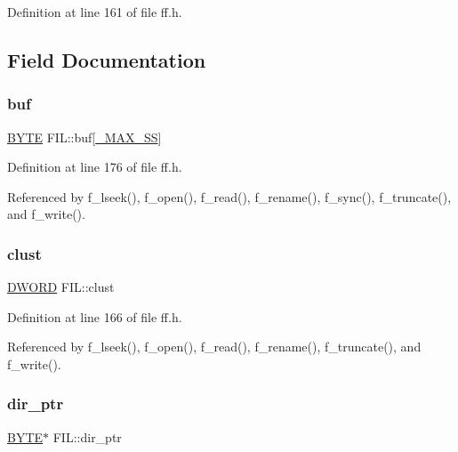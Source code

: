 Definition at line 161 of file ff.\+h.



\subsection{Field Documentation}
\mbox{\label{structFIL_a7a95fb86588663e48309b5cded7e207b}} 
\subsubsection{\texorpdfstring{buf}{buf}}
{\footnotesize\ttfamily \hyperlink{lz4_8c_a4ae1dab0fb4b072a66584546209e7d58}{B\+Y\+TE} F\+I\+L\+::buf\mbox{[}\hyperlink{ffconf_8h_ac271b697378912f17132cb9c7d0de024}{\+\_\+\+M\+A\+X\+\_\+\+SS}\mbox{]}}



Definition at line 176 of file ff.\+h.



Referenced by f\+\_\+lseek(), f\+\_\+open(), f\+\_\+read(), f\+\_\+rename(), f\+\_\+sync(), f\+\_\+truncate(), and f\+\_\+write().

\mbox{\label{structFIL_aa41312aba551b9a6d1c9d3c8c7d2734b}} 
\subsubsection{\texorpdfstring{clust}{clust}}
{\footnotesize\ttfamily \hyperlink{integer_8h_ad342ac907eb044443153a22f964bf0af}{D\+W\+O\+RD} F\+I\+L\+::clust}



Definition at line 166 of file ff.\+h.



Referenced by f\+\_\+lseek(), f\+\_\+open(), f\+\_\+read(), f\+\_\+rename(), f\+\_\+truncate(), and f\+\_\+write().

\mbox{\label{structFIL_a5af9e9fb312b629220eaf684dd28c4a9}} 
\subsubsection{\texorpdfstring{dir\+\_\+ptr}{dir\_ptr}}
{\footnotesize\ttfamily \hyperlink{lz4_8c_a4ae1dab0fb4b072a66584546209e7d58}{B\+Y\+TE}$\ast$ F\+I\+L\+::dir\+\_\+ptr}



